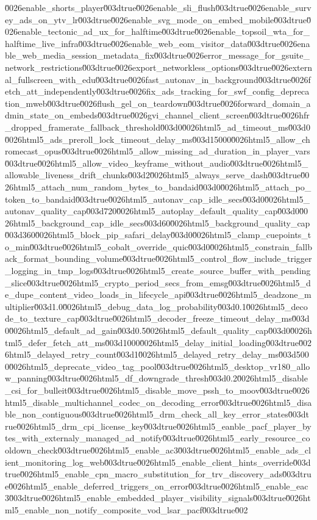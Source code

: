 {\u0026enable_shorts_player\u003dtrue\u0026enable_sli_flush\u003dtrue\u0026enable_survey_ads_on_ytv_lr\u003dtrue\u0026enable_svg_mode_on_embed_mobile\u003dtrue\u0026enable_tectonic_ad_ux_for_halftime\u003dtrue\u0026enable_topsoil_wta_for_halftime_live_infra\u003dtrue\u0026enable_web_eom_visitor_data\u003dtrue\u0026enable_web_media_session_metadata_fix\u003dtrue\u0026error_message_for_gsuite_network_restrictions\u003dtrue\u0026export_networkless_options\u003dtrue\u0026external_fullscreen_with_edu\u003dtrue\u0026fast_autonav_in_background\u003dtrue\u0026fetch_att_independently\u003dtrue\u0026fix_ads_tracking_for_swf_config_deprecation_mweb\u003dtrue\u0026flush_gel_on_teardown\u003dtrue\u0026forward_domain_admin_state_on_embeds\u003dtrue\u0026gvi_channel_client_screen\u003dtrue\u0026hfr_dropped_framerate_fallback_threshold\u003d0\u0026html5_ad_timeout_ms\u003d0\u0026html5_ads_preroll_lock_timeout_delay_ms\u003d15000\u0026html5_allow_chromecast_opus\u003dtrue\u0026html5_allow_missing_ad_duration_in_player_vars\u003dtrue\u0026html5_allow_video_keyframe_without_audio\u003dtrue\u0026html5_allowable_liveness_drift_chunks\u003d2\u0026html5_always_serve_dash\u003dtrue\u0026html5_attach_num_random_bytes_to_bandaid\u003d0\u0026html5_attach_po_token_to_bandaid\u003dtrue\u0026html5_autonav_cap_idle_secs\u003d0\u0026html5_autonav_quality_cap\u003d720\u0026html5_autoplay_default_quality_cap\u003d0\u0026html5_background_cap_idle_secs\u003d60\u0026html5_background_quality_cap\u003d360\u0026html5_block_pip_safari_delay\u003d0\u0026html5_clamp_cuepoints_to_min\u003dtrue\u0026html5_cobalt_override_quic\u003d0\u0026html5_constrain_fallback_format_bounding_volume\u003dtrue\u0026html5_control_flow_include_trigger_logging_in_tmp_logs\u003dtrue\u0026html5_create_source_buffer_with_pending_slice\u003dtrue\u0026html5_crypto_period_secs_from_emsg\u003dtrue\u0026html5_de_dupe_content_video_loads_in_lifecycle_api\u003dtrue\u0026html5_deadzone_multiplier\u003d1.0\u0026html5_debug_data_log_probability\u003d0.1\u0026html5_decode_to_texture_cap\u003dtrue\u0026html5_decoder_freeze_timeout_delay_ms\u003d0\u0026html5_default_ad_gain\u003d0.5\u0026html5_default_quality_cap\u003d0\u0026html5_defer_fetch_att_ms\u003d1000\u0026html5_delay_initial_loading\u003dtrue\u0026html5_delayed_retry_count\u003d1\u0026html5_delayed_retry_delay_ms\u003d5000\u0026html5_deprecate_video_tag_pool\u003dtrue\u0026html5_desktop_vr180_allow_panning\u003dtrue\u0026html5_df_downgrade_thresh\u003d0.2\u0026html5_disable_csi_for_bulleit\u003dtrue\u0026html5_disable_move_pssh_to_moov\u003dtrue\u0026html5_disable_multichannel_codec_on_decoding_error\u003dtrue\u0026html5_disable_non_contiguous\u003dtrue\u0026html5_drm_check_all_key_error_states\u003dtrue\u0026html5_drm_cpi_license_key\u003dtrue\u0026html5_eanble_pacf_player_bytes_with_externaly_managed_ad_notify\u003dtrue\u0026html5_early_resource_cooldown_check\u003dtrue\u0026html5_enable_ac3\u003dtrue\u0026html5_enable_ads_client_monitoring_log_web\u003dtrue\u0026html5_enable_client_hints_override\u003dtrue\u0026html5_enable_cpn_macro_substitution_for_trv_discovery_ads\u003dtrue\u0026html5_enable_deferred_triggers_on_error\u003dtrue\u0026html5_enable_eac3\u003dtrue\u0026html5_enable_embedded_player_visibility_signals\u003dtrue\u0026html5_enable_non_notify_composite_vod_lsar_pacf\u003dtrue\u002}
